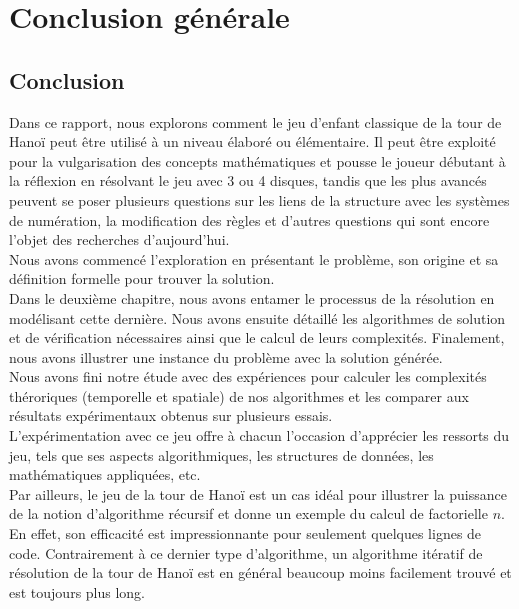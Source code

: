 \chapter{Conclusion générale}

\section{Conclusion}
Dans ce rapport, nous explorons comment le jeu d'enfant classique de la tour de Hanoï peut être utilisé à un niveau élaboré ou élémentaire. Il peut être exploité pour la vulgarisation des concepts mathématiques et pousse le joueur débutant à la réflexion en résolvant le jeu avec 3 ou 4 disques, tandis que les  plus avancés peuvent se poser plusieurs questions sur les liens de la structure avec les systèmes de numération, la modification des règles et d'autres questions qui sont encore l'objet des recherches d'aujourd'hui.\\
Nous avons commencé l'exploration en présentant le problème, son origine et sa définition formelle pour trouver la solution. \\
Dans le deuxième chapitre, nous avons entamer le processus de la résolution en modélisant cette dernière. Nous avons ensuite détaillé les algorithmes de solution et de vérification nécessaires ainsi que le calcul de leurs complexités. Finalement, nous avons illustrer une instance du problème avec la solution générée.  \\
Nous avons fini notre étude avec des expériences pour calculer les complexités théroriques (temporelle et spatiale) de nos algorithmes et les comparer aux résultats expérimentaux obtenus sur plusieurs essais.\\
L'expérimentation avec ce jeu offre à chacun l'occasion d'apprécier les ressorts du jeu, tels que ses aspects algorithmiques, les structures de données, les mathématiques appliquées, etc.\\
Par ailleurs, le jeu de la tour de Hanoï est un cas idéal pour illustrer la puissance
de la notion d’algorithme récursif et donne un exemple du calcul de factorielle $n$. En effet, son efficacité est impressionnante pour seulement quelques lignes de code. Contrairement à ce dernier type d'algorithme, un algorithme itératif de résolution de la tour de Hanoï est en général beaucoup moins facilement trouvé et est toujours plus long.